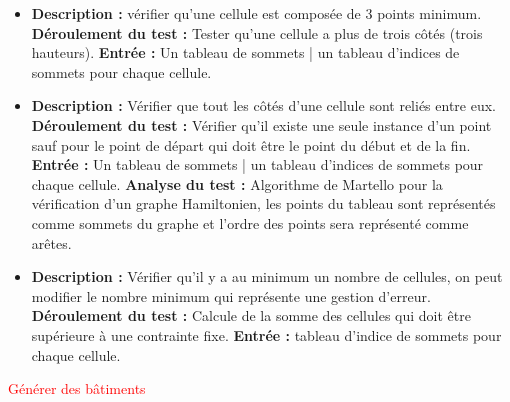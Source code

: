 {

\begin{itemize}

\item \textbf{\tab Description : } vérifier qu’une cellule est composée de 3 points minimum.\newline
\textbf{\tab Déroulement du test : } Tester qu’une cellule a plus de trois côtés (trois hauteurs).\newline
\textbf{\tab Entrée : } Un tableau de sommets | un tableau d’indices de sommets pour chaque cellule.


\item \textbf{\tab Description : } Vérifier que tout les côtés d’une cellule sont reliés entre eux.\newline
\textbf{\tab Déroulement du test : }  Vérifier qu’il existe une seule instance d’un point sauf pour le point de départ qui doit être le point du début et de la fin.\newline
\textbf{\tab Entrée : } Un tableau de sommets | un tableau d’indices de sommets pour chaque cellule.\newline
\textbf{\tab Analyse du test : }  Algorithme de Martello pour la vérification d’un graphe Hamiltonien, les points du tableau sont représentés comme sommets du graphe et l’ordre des points sera représenté comme arêtes.

\item \textbf{\tab Description : } Vérifier qu'il y a au minimum un nombre de cellules, on peut modifier le nombre minimum qui représente une gestion d’erreur.\newline
\textbf{\tab Déroulement du test : } Calcule de la somme des cellules qui doit être supérieure à une contrainte fixe.\newline
\textbf{\tab Entrée : } tableau d’indice de sommets pour chaque cellule.
\end{itemize}
 }
\besoin{}
{\textcolor{red}{Générer des bâtiments}}
